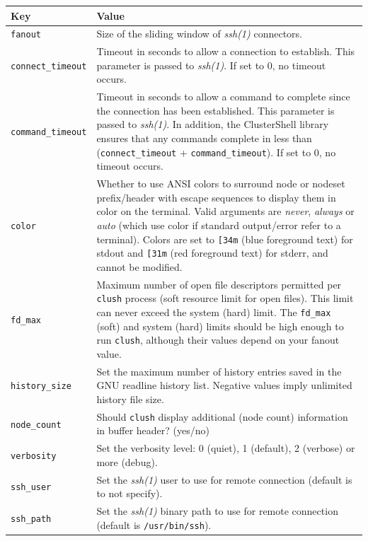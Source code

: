 \documentclass[english,a4paper]{csuserguide}
\newcommand{\clush}{\texttt{clush}\xspace}
\begin{document}
\begin{center}
\begin{tabular}{|p{3.2cm}|p{12.8cm}|} 
\hline 
\textbf{Key} & \textbf{Value} \\
\hline
\verb+fanout+& Size of the sliding window of \textit{ssh(1)} connectors.\\
\hline
\verb+connect_timeout+ & Timeout  in  seconds  to  allow a connection to establish. This parameter is passed to \textit{ssh(1)}. If set to 0, no timeout occurs.\\
\hline
\verb+command_timeout+ & Timeout in seconds to allow a command to complete since the connection has been established. This parameter is passed to \textit{ssh(1)}.  In addition, the ClusterShell library ensures that any commands complete in less than (\verb+connect_timeout+ + \verb+command_timeout+). If set to 0, no timeout occurs.\\
\hline
\verb+color+ & Whether  to  use  ANSI  colors  to  surround node or nodeset prefix/header with escape sequences to display them in color on the terminal. Valid arguments are \textit{never},  \textit{always} or \textit{auto} (which use color if standard output/error refer to a terminal). Colors are set to \verb+[34m+ (blue foreground text) for stdout and \verb+[31m+ (red foreground text)  for  stderr, and cannot be modified.\\
\hline
\verb+fd_max+ & Maximum  number  of  open  file descriptors permitted per \clush process (soft resource limit for open files). This limit can never exceed the system (hard) limit. The \verb+fd_max+ (soft)  and  system  (hard)  limits should be high enough to run \clush, although their values depend on your fanout value.\\
\hline
\verb+history_size+ & Set the maximum number of history entries saved in the GNU readline history list. Negative values imply unlimited history file size.\\
\hline
\verb+node_count+ & Should \clush display additional (node count) information in buffer header? (yes/no)\\
\hline
\verb+verbosity+ & Set the verbosity level: 0 (quiet), 1 (default), 2 (verbose) or more (debug).\\
\hline
\verb+ssh_user+ & Set the \textit{ssh(1)} user to use for remote connection (default is to not specify).\\
\hline
\verb+ssh_path+ & Set the \textit{ssh(1)} binary path to use for remote connection (default is \verb+/usr/bin/ssh+).\\

\end{tabular}
\end{center}
\end{document}
